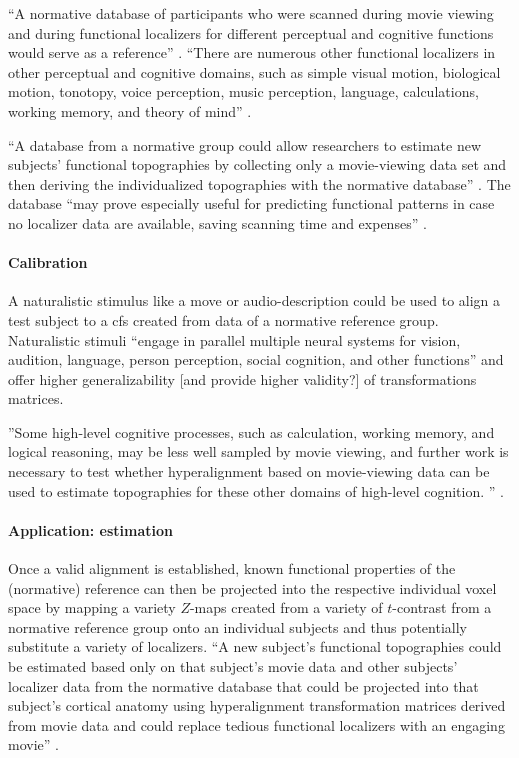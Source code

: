 %
``A normative database of participants who were scanned during movie viewing and
during functional localizers for different perceptual and cognitive functions
would serve as a reference'' \citep{jiahui2020predicting}.
%
``There are numerous other functional localizers in other perceptual and
cognitive domains, such as simple visual motion, biological motion, tonotopy,
voice perception, music perception, language, calculations, working memory, and
theory of mind'' \citep{jiahui2020predicting}.

%
``A database from a normative group could allow researchers to estimate new
subjects' functional topographies by collecting only a movie-viewing data set
and then deriving the individualized topographies with the normative database''
\citep{jiahui2020predicting}.
%
The database ``may prove especially useful for predicting functional patterns in
case no localizer data are available, saving scanning time and expenses''
\citep{rosenke2021probabilistic}.


\paragraph{Calibration}
%
A naturalistic stimulus like a move or audio-description could be used to align
a test subject to a \ac{cfs} created from data of a normative reference group.
%
Naturalistic stimuli ``engage in parallel multiple neural systems for vision,
audition, language, person perception, social cognition, and other functions''
\citep{jiahui2020predicting} and offer higher generalizability [and provide
higher validity?] of transformations matrices.

%
''Some high-level cognitive processes, such as calculation, working memory, and
logical reasoning, may be less well sampled by movie viewing, and further work
is necessary to test whether hyperalignment based on movie-viewing data can be
used to estimate topographies for these other domains of high-level cognition.
'' \citep{jiahui2020predicting}.


\paragraph{Application: estimation}

%
Once a valid alignment is established, known functional properties of the
(normative) reference can then be projected into the respective individual voxel
space by mapping a variety $Z$-maps created from a variety of $t$-contrast from
a normative reference group onto an individual subjects and thus potentially
substitute a variety of localizers.
%
``A new subject's functional topographies could be estimated based only on that
subject's movie data and other subjects' localizer data from the normative
database that could be projected into that subject's cortical anatomy using
hyperalignment transformation matrices derived from movie data and could replace
tedious functional localizers with an engaging movie''
\citep{jiahui2020predicting}.

